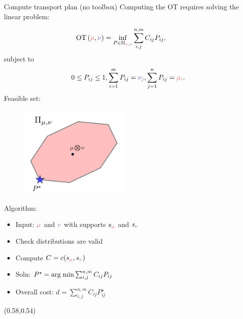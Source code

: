 \documentclass[pdf,aspectratio=169,10pt]{beamer}
\begin{document}
 

\begin{frame}{ Compute transport plan (no toolbox)}
    Computing the OT requires solving the linear problem:
\begin{minipage}{0.49\textwidth}  
\begin{equation*}
    \hspace{-2em}\OT{(\er{\mu},\eb{\nu})} = \inf_{P\in\Pi_{\er{\mu},\eb{\nu}}}  \sum_{i,j}^{n,m} C_{ij}P_{ij}, 
\end{equation*}
subject to
\begin{equation*}
    0\leq P_{ij} \leq 1, \sum_{i=1}^m P_{ij} = \eb{\nu_j},  \sum_{j=1}^n P_{ij} = \er{\mu_i}.
\end{equation*}
Feasible set:
\begin{figure}
            \includegraphics[width=0.48\textwidth]{../img/polytope1.pdf}\hspace{2em}

\end{figure}

\end{minipage}
\hfill
\begin{minipage}{0.49\textwidth}  
Algorithm:

\begin{itemize}
    \item Input: $\er{\mu}$ and $\eb{\nu}$ with supports $s_\er{\mu}$ and $s_\eb{\nu}$
    \item Check distributions are valid
    \item Compute $C = c(s_\er{\mu},s_\eb{\nu})$
    \item Soln: $P^\star = \mathop{\rm arg \; min}\limits \sum_{i,j}^{n,m} C_{ij}P_{ij} $
    \item Overall cost: $d = \sum_{i,j}^{n,m} C_{ij}P^\star_{ij}$ 
\end{itemize}
\end{minipage}

\begin{textblock}{0.45} (0.58,0.54)
\small
{}
\end{textblock}
\end{frame}
\end{document}
